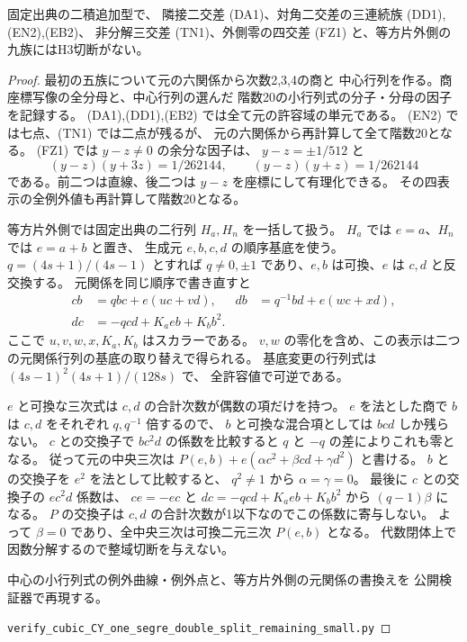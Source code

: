 \begin{proposition}\label{prop:cubic-CY-one-segre-double-split-small-empty}
固定出典\cite{AS4CYpinned}の二積追加型で、
隣接二交差 (DA1)、対角二交差の三連続族 (DD1),(EN2),(EB2)、
非分解三交差 (TN1)、外側零の四交差 (FZ1) と、等方片外側の九族にはH3切断がない。
\end{proposition}
\begin{proof}
最初の五族について元の六関係から次数2,3,4の商と
中心行列を作る。商座標写像の全分母と、中心行列の選んだ
階数20の小行列式の分子・分母の因子を記録する。
(DA1),(DD1),(EB2) では全て元の許容域の単元である。
(EN2) では七点、(TN1) では二点が残るが、
元の六関係から再計算して全て階数20となる。
(FZ1) では $y-z\ne0$ の余分な因子は、
$y-z=\pm1/512$ と
\[
 (y-z)(y+3z)=1/262144,\qquad (y-z)(y+z)=1/262144
\]
である。前二つは直線、後二つは $y-z$ を座標にして有理化できる。
その四表示の全例外値も再計算して階数20となる。

等方片外側では固定出典の二行列 $H_a,H_n$ を一括して扱う。
$H_a$ では $e=a$、$H_n$ では $e=a+b$ と置き、
生成元 $e,b,c,d$ の順序基底を使う。$q=(4s+1)/(4s-1)$ とすれば
$q\ne0,\pm1$ であり、$e,b$ は可換、$e$ は $c,d$ と反交換する。
元関係を同じ順序で書き直すと
\begin{align*}
 cb&=qbc+e(uc+vd),&
 db&=q^{-1}bd+e(wc+xd),\\
 dc&=-qcd+K_a eb+K_b b^2 .
\end{align*}
ここで $u,v,w,x,K_a,K_b$ はスカラーである。
$v,w$ の零化を含め、この表示は二つの元関係行列の基底の取り替えで得られる。
基底変更の行列式は $(4s-1)^2(4s+1)/(128s)$ で、
全許容値で可逆である。

$e$ と可換な三次式は $c,d$ の合計次数が偶数の項だけを持つ。
$e$ を法とした商で $b$ は $c,d$ をそれぞれ $q,q^{-1}$ 倍するので、
$b$ と可換な混合項としては $bcd$ しか残らない。
$c$ との交換子で $bc^2d$ の係数を比較すると
$q$ と $-q$ の差によりこれも零となる。
従って元の中央三次は
$P(e,b)+e(\alpha c^2+\beta cd+\gamma d^2)$ と書ける。
$b$ との交換子を $e^2$ を法として比較すると、
$q^2\ne1$ から $\alpha=\gamma=0$。
最後に $c$ との交換子の $ec^2d$ 係数は、
$ce=-ec$ と $dc=-qcd+K_a eb+K_b b^2$ から $(q-1)\beta$ になる。
$P$ の交換子は $c,d$ の合計次数が1以下なのでこの係数に寄与しない。
よって $\beta=0$ であり、全中央三次は可換二元三次 $P(e,b)$ となる。
代数閉体上で因数分解するので整域切断を与えない。

中心の小行列式の例外曲線・例外点と、等方片外側の元関係の書換えを
公開検証器で再現する。
\par\noindent\texttt{verify\_cubic\_CY\_one\_segre\_double\_split\_remaining\_small.py}
\par
\end{proof}

